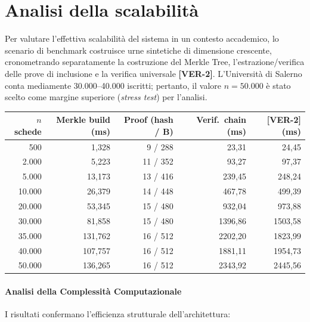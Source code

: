 \section{Analisi della scalabilità}
\label{sec:wp4_scalabilita}

Per valutare l'effettiva scalabilità del sistema in un contesto accademico, lo scenario di benchmark costruisce urne sintetiche di dimensione crescente, cronometrando separatamente la costruzione del Merkle Tree, l'estrazione/verifica delle prove di inclusione e la verifica universale \textbf{[VER-2]}. L'Università di Salerno conta mediamente 30.000--40.000 iscritti; pertanto, il valore $n = 50.000$ è stato scelto come margine superiore (\emph{stress test}) per l'analisi.

\begin{center}
\small
\begin{tabular}{|r|r|r|r|r|}
\hline
\textbf{$n$ schede} & \textbf{Merkle build (ms)} & \textbf{Proof (hash / B)} &
\textbf{Verif.~chain (ms)} & \textbf{[VER-2] (ms)} \\
\hline
500    & 1,328   & 9 / 288   & 23,31   & 24,45   \\
2.000  & 5,223   & 11 / 352  & 93,27   & 97,37   \\
5.000  & 13,173  & 13 / 416  & 239,45  & 248,24  \\
10.000 & 26,379  & 14 / 448  & 467,78  & 499,39  \\
20.000 & 53,345  & 15 / 480  & 932,04  & 973,88  \\
30.000 & 81,858  & 15 / 480  & 1396,86 & 1503,58 \\
35.000 & 131,762 & 16 / 512  & 2202,20 & 1823,99 \\
40.000 & 107,757 & 16 / 512  & 1881,11 & 1954,73 \\
50.000 & 136,265 & 16 / 512  & 2343,92 & 2445,56 \\
\hline
\end{tabular}
\end{center}

\paragraph{Analisi della Complessità Computazionale}
I risultati confermano l'efficienza strutturale dell'architettura:

